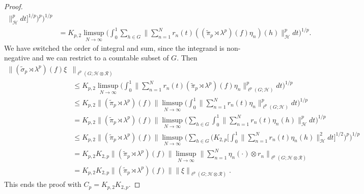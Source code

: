 \documentclass[10pt,a4paper]{amsart}
\newcommand{\mc}{\mathcal}
\newcommand{\md}{d}
\newcommand{\wt}{\widetilde}
\begin{document}
\begin{proof}
\begin{align*}
\bigr\|^p_{\mc{H}}
\md t
\bigr]^{1/p}\bigr)^{p}
\bigr)^{1/p}\\
&=
K_{p,2}
\limsup_{N\to\infty}
\bigl(
\int_{0}^{1}
\sum_{h\in G}
\bigl\|
\sum_{n=1}^{N} r_n(t)
((\wt{\pi}_p\rtimes\lambda^p)(f)\eta_n)(h) \bigr\|^p_{\mc{H}}
\md t
\bigr)^{1/p}.
\end{align*}
We have switched the order of integral and sum, since the integrand is non-negative and we can restrict to a countable subset of $G$. Then
\begin{align*}
\|(\wt{\sigma}_p\rtimes\lambda^p)(f) \xi&\|_{\ell^p(G;\mc{H}\otimes \mc{R})}\\
&\le
K_{p,2}
\limsup_{N\to\infty}
\bigl(
\int_{0}^{1}
\bigl\|
\sum_{n=1}^{N} r_n(t)
(\wt{\pi}_p\rtimes\lambda^p)(f)\eta_n \bigr\|^p_{\ell^p(G;\mc{H})}
\md t
\bigr)^{1/p}\\
&\le
K_{p,2}
\|(\wt{\pi}_p\rtimes\lambda^p)(f)\|
\limsup_{N\to\infty}
\bigl(
\int_{0}^{1}
\bigl\|
\sum_{n=1}^{N} r_n(t)
 \eta_n \bigr\|^p_{\ell^p(G;\mc{H})}
\md t
\bigr)^{1/p}\\
&=
K_{p,2}
\|(\wt{\pi}_p\rtimes\lambda^p)(f)\|
\limsup_{N\to\infty}
\bigl(
\sum_{h\in G}
\int_{0}^{1}
\bigl\|
\sum_{n=1}^{N} r_n(t)
 \eta_n(h) \bigr\|^p_{ \mc{H}}
\md t
\bigr)^{1/p}\\
&\le
K_{p,2}
\|(\wt{\pi}_p\rtimes\lambda^p)(f)\|
\limsup_{N\to\infty}
\bigl(
\sum_{h\in G}
\bigl(
K_{2,p}\bigl[\int_{0}^{1}
\bigl\|
\sum_{n=1}^{N} r_n(t)
 \eta_n(h) \bigr\|^2_{ \mc{H}}
\md t\bigr]^{1/2}\bigr)^{p}
\bigr)^{1/p}\\
&=
K_{p,2} K_{2,p}
\|(\wt{\pi}_p\rtimes\lambda^p)(f)\|
\limsup_{N\to\infty}
\bigl\|
\sum_{n=1}^{N}
 \eta_n(\cdot)\otimes r_n \bigr\|_{\ell^p(G; \mc{H}\otimes \mc{R})}\\
 &=
K_{p,2} K_{2,p}
\|(\wt{\pi}_p\rtimes\lambda^p)(f)\|
\|
\xi \|_{\ell^p(G; \mc{H}\otimes \mc{R})}.
\end{align*}
This ends the proof with $C_p=K_{p,2} K_{2,p}$.
\end{proof}
\end{document}

